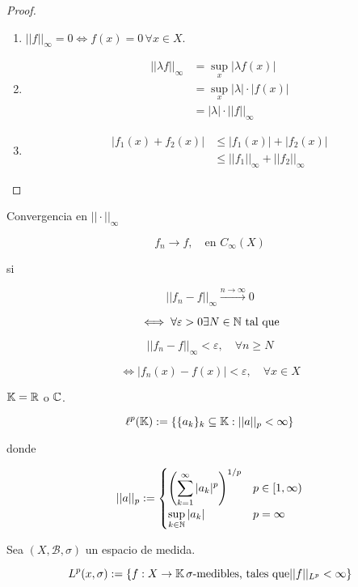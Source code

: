 \begin{proof}
    \begin{enumerate}
        \item $||f||_\infty=0\iff f(x)=0\, \forall x\in X$.

        \item \begin{align*}||\lambda f||_\infty&=\sup_x |\lambda f(x)|\\
            &=\sup_x |\lambda|\cdot |f(x)|\\
            &=|\lambda|\cdot ||f||_\infty
        \end{align*}

        \item \begin{align*}
            |f_1(x)+f_2(x)|&\leq |f_1(x)|+|f_2(x)|\\
            &\leq ||f_1||_\infty+||f_2||_\infty
        \end{align*}
    \end{enumerate}
\end{proof}

Convergencia en $||\cdot||_\infty$

\[f_n\to f,\quad \text{en }C_\infty(X)\]

si 

\[||f_n-f||_\infty\xrightarrow{n\to\infty} 0\]

\[\iff \forall \varepsilon>0 \exists N\in\mathbb{N}\text{ tal que}\]

\[||f_n-f||_\infty<\varepsilon,\quad \forall n\geq N\]

\[\iff |f_n(x)-f(x)|<\varepsilon,\quad \forall x\in X\]

\begin{fexample}
    $\mathbb{K}=\mathbb{R}$ o $\mathbb{C}$.

    \[\ell^p(\mathbb{K}):=\{\{a_k\}_k \subseteq \mathbb{K}: ||a||_p<\infty\}\]

    donde

    \[||a||_p:=\begin{cases}\left(\displaystyle\sum_{k=1}^\infty |a_k|^p\right)^{1/p}&p\in [1,\infty)\\
    \displaystyle\sup_{k\in\mathbb{N}} |a_k|& p=\infty\end{cases}\]
\end{fexample}

Sea $(X,\mathcal{B},\sigma)$ un espacio de medida.

\[L^p(x,\sigma):=\{f:X\to\mathbb{K} \, \sigma\text{-medibles, tales que} ||f||_{L^p}<\infty\}\]

